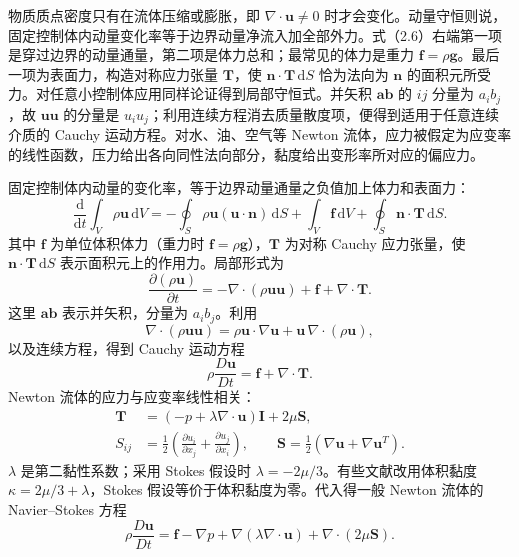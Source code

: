 \documentclass[11pt,a4paper,openany,fontset=none]{ctexbook}
\begin{document}
物质质点密度只有在流体压缩或膨胀，即 $\nabla\cdot\bm u\ne0$ 时才会变化。动量守恒则说，固定控制体内动量变化率等于边界动量净流入加全部外力。式（2.6）右端第一项是穿过边界的动量通量，第二项是体力总和；最常见的体力是重力 $\bm f=\rho\bm g$。最后一项为表面力，构造对称应力张量 $\bm T$，使 $\bm n\cdot\bm T\,\mathrm dS$ 恰为法向为 $\bm n$ 的面积元所受力。对任意小控制体应用同样论证得到局部守恒式。并矢积 $\bm a\bm b$ 的 $ij$ 分量为 $a_i b_j$，故 $\bm u\bm u$ 的分量是 $u_i u_j$；利用连续方程消去质量散度项，便得到适用于任意连续介质的 Cauchy 运动方程。对水、油、空气等 Newton 流体，应力被假定为应变率的线性函数，压力给出各向同性法向部分，黏度给出变形率所对应的偏应力。


固定控制体内动量的变化率，等于边界动量通量之负值加上体力和表面力：
\begin{equation}
 \frac{\mathrm d}{\mathrm dt}\int_V\rho\bm u\,\mathrm dV
 =-\oint_S\rho\bm u(\bm u\cdot\bm n)\,\mathrm dS
 +\int_V\bm f\,\mathrm dV+\oint_S\bm n\cdot\bm T\,\mathrm dS . \tag{2.6}
\end{equation}
其中 $\bm f$ 为单位体积体力（重力时 $\bm f=\rho\bm g$），$\bm T$ 为对称 Cauchy 应力张量，使 $\bm n\cdot\bm T\,\mathrm dS$ 表示面积元上的作用力。局部形式为
\begin{equation}
 \frac{\partial(\rho\bm u)}{\partial t}=-\nabla\cdot(\rho\bm u\bm u)+\bm f+\nabla\cdot\bm T . \tag{2.7}
\end{equation}
这里 $\bm a\bm b$ 表示并矢积，分量为 $a_i b_j$。利用
\begin{equation}
 \nabla\cdot(\rho\bm u\bm u)=\rho\bm u\cdot\nabla\bm u+\bm u\,\nabla\cdot(\rho\bm u), \tag{2.8}
\end{equation}
以及连续方程，得到 Cauchy 运动方程
\begin{equation}
 \rho\frac{D\bm u}{Dt}=\bm f+\nabla\cdot\bm T . \tag{2.9}
\end{equation}
Newton 流体的应力与应变率线性相关：
\begin{align}
 \bm T&=(-p+\lambda\nabla\cdot\bm u)\bm I+2\mu\bm S, \tag{2.10}\\
 S_{ij}&=\frac12\left(\frac{\partial u_i}{\partial x_j}+\frac{\partial u_j}{\partial x_i}\right),\qquad
 \bm S=\frac12\left(\nabla\bm u+\nabla\bm u^{T}\right). \tag{2.11}
\end{align}
$\lambda$ 是第二黏性系数；采用 Stokes 假设时 $\lambda=-2\mu/3$。有些文献改用体积黏度 $\kappa=2\mu/3+\lambda$，Stokes 假设等价于体积黏度为零。代入得一般 Newton 流体的 Navier--Stokes 方程
\begin{equation}
 \rho\frac{D\bm u}{Dt}=\bm f-\nabla p+\nabla(\lambda\nabla\cdot\bm u)+\nabla\cdot(2\mu\bm S). \tag{2.12}
\end{equation}
\end{document}

